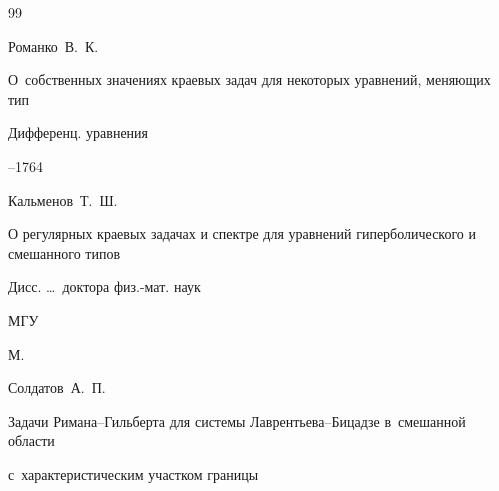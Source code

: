 \begin{thebibliography}{99}





\by Романко~В.~К.

\paper О~собственных значениях краевых задач для некоторых уравнений, меняющих тип

\jour Дифференц. уравнения




--1764














\by Кальменов~Т.~Ш.

\thesis О регулярных краевых задачах и спектре для уравнений гиперболического и смешанного типов

\thesisinfo Дисс. \dots\ доктора физ.-мат. наук


\publ МГУ

\publaddr М.
















\by Солдатов~А.~П.

\paper Задачи Римана--Гильберта для системы Лаврентьева--Бицадзе в~смешанной области

с~характеристическим участком границы


\end{thebibliography}

